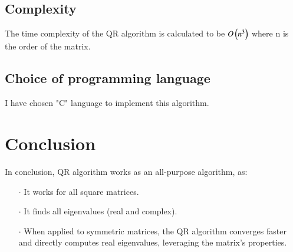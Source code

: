 \documentclass[journal]{IEEEtran}
\begin{document}
\subsection{Complexity}
The time complexity of the QR algorithm is calculated to be $O\left(n^3\right)$ where n is the order of the matrix.
\subsection{Choice of programming language}
I have chosen "C" language to implement this algorithm.
\section{Conclusion}
In conclusion, QR algorithm works as an all-purpose algorithm, as:
\begin{enumerate}
    \item[$\cdot$] It works for all square matrices.
    \item[$\cdot$] It finds all eigenvalues (real and complex).
    \item[$\cdot$] When applied to symmetric matrices, the QR algorithm converges faster and directly computes real eigenvalues, leveraging the matrix's properties.    
\end{enumerate}
\end{document}
